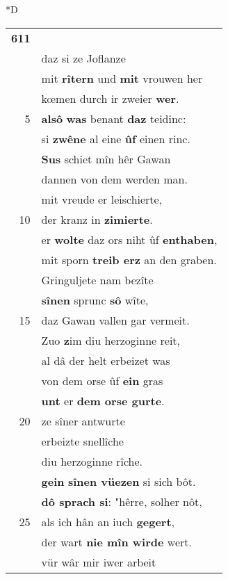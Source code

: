 \documentclass[8pt,a4paper,notitlepage]{article}
\begin{document}
\begin{table}[ht]
\begin{minipage}[t]{0.5\linewidth}
\small
\begin{center}*D
\end{center}
\begin{tabular}{rl}
\textbf{611} & \textit{\begin{large}S\end{large}}i gâben fîanze,\\ 
 & daz si ze Joflanze\\ 
 & mit \textbf{rîtern} und \textbf{mit} vrouwen her\\ 
 & kœmen durch ir zweier \textbf{wer}.\\ 
5 & \textbf{alsô} \textbf{was} benant \textbf{daz} teidinc:\\ 
 & si \textbf{zwêne} al eine \textbf{ûf} einen rinc.\\ 
 & \textbf{Sus} schiet mîn hêr Gawan\\ 
 & dannen von dem werden man.\\ 
 & mit vreude er leischierte,\\ 
10 & der kranz in \textbf{zimierte}.\\ 
 & er \textbf{wolte} daz ors niht ûf \textbf{enthaben},\\ 
 & mit sporn \textbf{treib erz} an den graben.\\ 
 & Gringuljete nam bezîte\\ 
 & \textbf{sînen} sprunc \textbf{sô} wîte,\\ 
15 & daz Gawan vallen gar vermeit.\\ 
 & Zuo \textbf{z}im diu herzoginne reit,\\ 
 & al dâ der helt erbeizet was\\ 
 & von dem orse ûf \textbf{ein} gras\\ 
 & \textbf{unt} er \textbf{dem orse gurte}.\\ 
20 & ze sîner antwurte\\ 
 & erbeizte snellîche\\ 
 & diu herzoginne rîche.\\ 
 & \textbf{gein} \textbf{sînen vüezen} si sich bôt.\\ 
 & \textbf{dô sprach si}: "hêrre, solher nôt,\\ 
25 & als ich hân an iuch \textbf{gegert},\\ 
 & der wart \textbf{nie mîn wirde} wert.\\ 
 & vür wâr mir iwer arbeit\\ 

\end{tabular}
\end{minipage}
\end{table}
\end{document}
